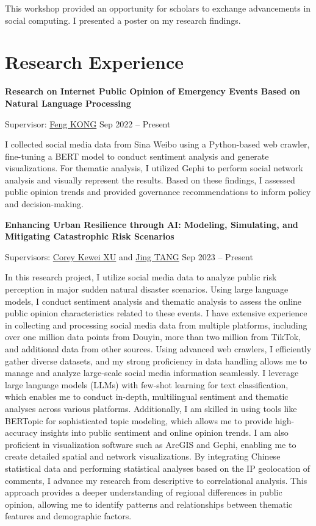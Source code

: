 \documentclass[letterpaper, 11pt]{article}
\begin{document}
This workshop provided an opportunity for scholars to exchange advancements in social computing. I presented a poster on my research findings.

\section{Research Experience}
\textbf{Research on Internet Public Opinion of Emergency Events Based on Natural Language Processing}

Supervisor: \href{https://cohd.cau.edu.cn/art/2020/11/27/art_48059_998984.html}{Feng KONG} \hfill Sep 2022 -- Present

I collected social media data from Sina Weibo using a Python-based web crawler, fine-tuning a BERT model to conduct sentiment analysis and generate visualizations. For thematic analysis, I utilized Gephi to perform social network analysis and visually represent the results. Based on these findings, I assessed public opinion trends and provided governance recommendations to inform policy and decision-making.

\vspace{0.5em}
\textbf{Enhancing Urban Resilience through AI: Modeling, Simulating, and Mitigating Catastrophic Risk Scenarios}

Supervisors: \href{https://facultyprofiles.hkust-gz.edu.cn/faculty-personal-page/XU-Kewei/coreyxu}{Corey Kewei XU} and \href{https://facultyprofiles.hkust-gz.edu.cn/faculty-personal-page/TANG-Jing/jingtang}{Jing TANG} \hfill Sep 2023 -- Present

In this research project, I utilize social media data to analyze public risk perception in major sudden natural disaster scenarios. Using large language models, I conduct sentiment analysis and thematic analysis to assess the online public opinion characteristics related to these events. I have extensive experience in collecting and processing social media data from multiple platforms, including over one million data points from Douyin, more than two million from TikTok, and additional data from other sources. Using advanced web crawlers, I efficiently gather diverse datasets, and my strong proficiency in data handling allows me to manage and analyze large-scale social media information seamlessly. I leverage large language models (LLMs) with few-shot learning for text classification, which enables me to conduct in-depth, multilingual sentiment and thematic analyses across various platforms. Additionally, I am skilled in using tools like BERTopic for sophisticated topic modeling, which allows me to provide high-accuracy insights into public sentiment and online opinion trends. I am also proficient in visualization software such as ArcGIS and Gephi, enabling me to create detailed spatial and network visualizations. By integrating Chinese statistical data and performing statistical analyses based on the IP geolocation of comments, I advance my research from descriptive to correlational analysis. This approach provides a deeper understanding of regional differences in public opinion, allowing me to identify patterns and relationships between thematic features and demographic factors.
\end{document}
